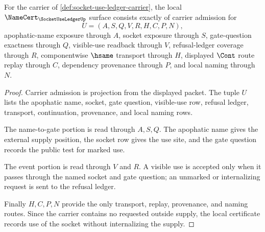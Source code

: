 \begin{theorem}
\label{thm:socket-use-ledger-namecert-obligations}
For the carrier of \autoref{def:socket-use-ledger-carrier}, the local $\NameCert_{\SocketUseLedgerUp}$ surface consists exactly of carrier admission for
$$
U=(A,S,Q,V,R,H,C,P,N),
$$
apophatic-name exposure through $A$, socket exposure through $S$, gate-question exactness through $Q$, visible-use readback through $V$, refusal-ledger coverage through $R$, componentwise $\hsame$ transport through $H$, displayed $\Cont$ route replay through $C$, dependency provenance through $P$, and local naming through $N$.
\end{theorem}
\begin{proof}
Carrier admission is projection from the displayed packet. The tuple $U$ lists the apophatic name, socket, gate question, visible-use row, refusal ledger, transport, continuation, provenance, and local naming rows.

The name-to-gate portion is read through $A,S,Q$. The apophatic name gives the external supply position, the socket row gives the use site, and the gate question records the public test for marked use.

The event portion is read through $V$ and $R$. A visible use is accepted only when it passes through the named socket and gate question; an unmarked or internalizing request is sent to the refusal ledger.

Finally $H,C,P,N$ provide the only transport, replay, provenance, and naming routes. Since the carrier contains no requested outside supply, the local certificate records use of the socket without internalizing the supply.
\end{proof}

